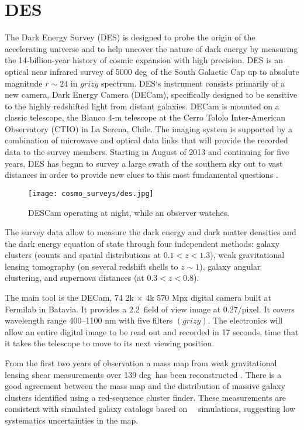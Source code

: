 \section{DES}
\label{DES}
The Dark Energy Survey (DES) is designed to probe the origin of the accelerating universe and to help uncover the nature of dark energy by measuring the \mbox{14-billion-year} history of cosmic expansion with high precision. DES is an optical near infrared survey of 5000 deg\sq\ of the South Galactic Cap up to absolute magnitude $r\sim24$ in $grizy$ spectrum. DES`s instrument consists primarily of a new camera, Dark Energy Camera (DECam), specifically designed to be sensitive to the highly redshifted light from distant galaxies. DECam is mounted on a classic telescope, the Blanco 4-m telescope at the Cerro Tololo Inter-American Observatory (CTIO) in La Serena, Chile. The imaging system is supported by a combination of microwave and optical data links that will provide the recorded data to the survey members. Starting in August of 2013 and continuing for five years, DES has begun to survey a large swath of the southern sky out to vast distances in order to provide new clues to this most fundamental questions \cite{DES}.

\begin{figure}[htb]
    \centering
    \texttt{[image: cosmo\_surveys/des.jpg]}
    \caption{DESCam operating at night, while an observer watches.}
    \label{fig:des}
\end{figure}
The survey data allow to measure the dark energy and dark matter densities and the dark energy equation of state through four independent methods: galaxy clusters (counts and spatial distributions at $0.1<z<1.3$), weak gravitational lensing tomography (on several redshift shells to $z\sim1$), galaxy angular clustering, and supernova distances (at $0.3<z<0.8$).

The main tool is the DECam, 74 2k $\times$ 4k 570 Mpx digital camera built at Fermilab in Batavia. It provides a 2.2\textdegree\ field of view image at 0.27\arcsec/pixel. It covers wavelength range 400--1100 nm with five filters $(grizy)$. The electronics will allow an entire digital image to be read out and recorded in 17 seconds, time that it takes the telescope to move to its next viewing position.

From the first two years of observation a mass map from weak gravitational lensing shear measurements over 139 deg\sq\ has been reconstructed \cite{DES_mass}. There is a good agreement between the mass map and the distribution of massive galaxy clusters identified using a red-sequence cluster finder. These measurements are consistent with simulated galaxy catalogs based on \LCDM\ \nbody\ simulations, suggesting low systematics uncertainties in the map.

